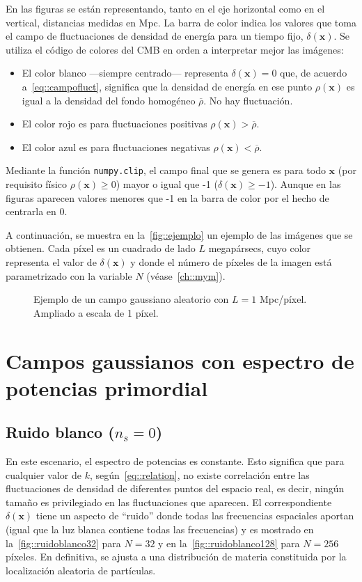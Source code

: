 En las figuras se están representando, tanto en el eje horizontal como en el vertical, distancias medidas en Mpc. La barra de color indica los valores que toma el campo de fluctuaciones de densidad de energía para un tiempo fijo, \(\delta(\symbf{x})\). Se utiliza el código de colores del CMB en orden a interpretar mejor las imágenes:
\begin{itemize}
    \item El color blanco ---siempre centrado--- representa \(\delta(\symbf{x})=0\) que, de acuerdo a~\eqref{eq::campofluct}, significa que la densidad de energía en ese punto \(\rho(\symbf{x})\) es igual a la densidad del fondo homogéneo \(\overbar{\rho}\). No hay fluctuación.
    \item El color rojo es para fluctuaciones positivas \(\rho(\symbf{x})>\overbar{\rho}\).
    \item El color azul es para fluctuaciones negativas \(\rho(\symbf{x})<\overbar{\rho}\).
\end{itemize}
Mediante la función \texttt{numpy.clip}, el campo final que se genera es para todo \(\symbf{x}\) (por requisito físico \(\rho(\symbf{x})\geq 0\)) mayor o igual que -1 (\(\delta(\symbf{x})\geq -1\)). Aunque en las figuras aparecen valores menores que -1 en la barra de color por el hecho de centrarla en 0.

A continuación, se muestra en la~\autoref{fig::ejemplo} un ejemplo de las imágenes que se obtienen. Cada píxel es un cuadrado de lado \(L\) megapársecs, cuyo color representa el valor de \(\delta(\symbf{x})\) y donde el número de píxeles de la imagen está parametrizado con la variable \(N\) (véase~\autoref{ch::mym}).
\begin{figure}[h!]
    \centering
    {}
    \caption[Ejemplo de un campo gaussiano aleatorio con \(L=1\) Mpc/píxel]{Ejemplo de un campo gaussiano aleatorio con \(L=1\) Mpc/píxel. Ampliado a escala de 1 píxel.}
    \label{fig::ejemplo}
\end{figure}
\section{Campos gaussianos con espectro de potencias primordial}
\subsection{Ruido blanco (\texorpdfstring{\(n_s=0\)}{ns=0})}
En este escenario, el espectro de potencias es constante. Esto significa que para cualquier valor de \(k\), según~\eqref{eq::relation}, no existe correlación entre las fluctuaciones de densidad de diferentes puntos del espacio real, es decir, ningún tamaño es privilegiado en las fluctuaciones que aparecen. El correspondiente \(\delta(\symbf{x})\) tiene un aspecto de ``ruido'' donde todas las frecuencias espaciales aportan (igual que la luz blanca contiene todas las frecuencias) y es mostrado en la~\autoref{fig::ruidoblanco32} para \(N=32\) y en la~\autoref{fig::ruidoblanco128} para \(N=256\) píxeles. En definitiva, se ajusta a una distribución de materia constituida por la localización aleatoria de partículas.

